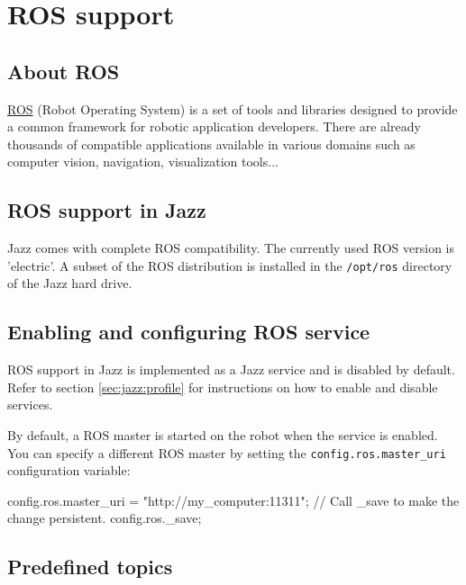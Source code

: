
\chapter{ROS support}

\section{About ROS}

\href{http://www.ros.org}{ROS} (Robot  Operating System) is a set of tools and
libraries designed to provide a common framework for robotic application
developers. There are already thousands of compatible applications available in
various domains such as computer vision, navigation, visualization tools...

\section{ROS support in Jazz}

Jazz comes with complete ROS compatibility.
The currently used ROS version is 'electric'. A subset of the ROS distribution
is installed in the \lstinline|/opt/ros| directory of the Jazz hard drive.


\section{Enabling and configuring ROS service}

ROS support in Jazz is implemented as a Jazz service and is disabled
by default.  Refer to section \autoref{sec:jazz:profile} for
instructions on how to enable and disable services.

By default, a ROS master is started on the robot when the service is enabled.
You can specify a different ROS master by setting the
\lstinline|config.ros.master_uri| configuration variable:

\begin{urbiunchecked}
  config.ros.master_uri = "http://my_computer:11311";
  // Call _save to make the change persistent.
  config.ros._save;
\end{urbiunchecked}

\section{Predefined topics}

